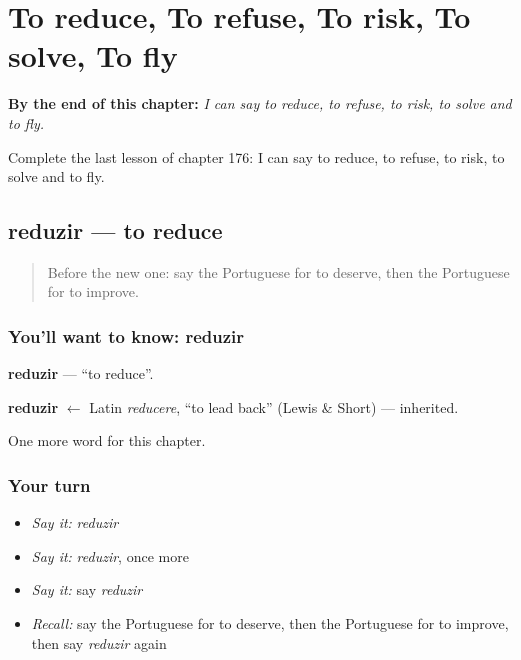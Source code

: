 
\chapter{To reduce, To refuse, To risk, To solve, To fly}
\label{ch:pt-to-reduce-to-refuse-to-risk-to-solve-to-fly}

\begin{chapteropening}
\textbf{By the end of this chapter:} \emph{I can say to reduce, to refuse, to risk, to solve and to fly.}

Complete the last lesson of chapter 176: I can say to reduce, to refuse, to risk, to solve and to fly.
\end{chapteropening}

\section[reduzir]{reduzir — to reduce}

\label{lesson:PT-C176-reduzir}



\begin{quote}
Before the new one: say the Portuguese for to deserve, then the Portuguese for to improve.
\end{quote}

\subsection*{You'll want to know: reduzir}
\textbf{reduzir} — \textquotedblleft{}to reduce\textquotedblright{}.

\begin{cousinweb}
\textbf{reduzir} $\leftarrow$ Latin \emph{reducere}, \textquotedblleft{}to lead back\textquotedblright{} (Lewis \& Short) — inherited.
\end{cousinweb}

\begin{grammarlens}[title={What you've built}]
One more word for this chapter.
\end{grammarlens}

\subsection*{Your turn}
\begin{itemize}
\raggedright
  \item \emph{Say it:} \emph{reduzir}
  \item \emph{Say it:} \emph{reduzir}, once more
  \item \emph{Say it:} say \emph{reduzir}
  \item \emph{Recall:} say the Portuguese for to deserve, then the Portuguese for to improve, then say \emph{reduzir} again
\end{itemize}

